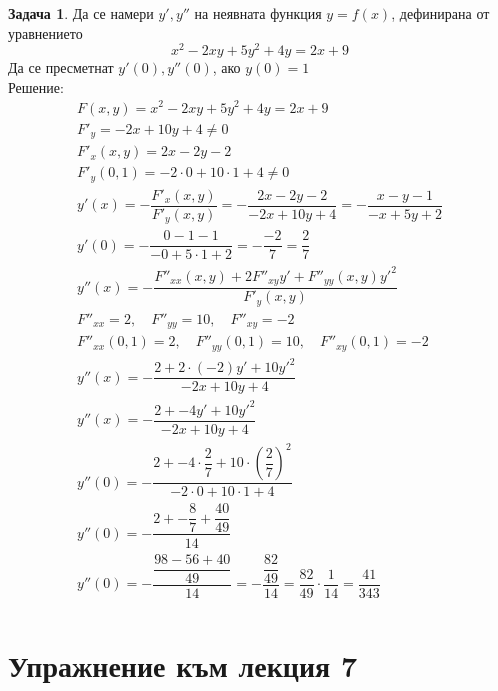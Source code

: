 \documentclass[a4paper,fleqn,12pt]{article}
\theoremstyle{definition}
\newtheorem{task}{Задача}[subsection]
\begin{document}
\begin{task}
Да се намери $y', y''$ на неявната функция $y = f(x)$, дефинирана от уравнението 
$$x^2 - 2xy + 5y^2 + 4y = 2x + 9$$
Да се пресметнат $y'(0), y''(0)$, ако $y(0) = 1$ \\
Решение: 
\begin{gather*}
F(x,y) = x^2 - 2xy + 5y^2 + 4y = 2x + 9\\
F'_y = -2x + 10y + 4 \neq 0\\
F'_x(x,y) = 2x - 2y - 2\\
F'_y(0,1) = -2 \cdot 0 + 10 \cdot 1 + 4 \neq 0\\
y'(x) = - \dfrac{F'_x(x,y)}{F'_y(x,y)} = - \dfrac{2x - 2y - 2}{-2x + 10y + 4} = - \dfrac{x - y - 1}{- x + 5y + 2}\\
y'(0) = - \dfrac{0 - 1 - 1}{- 0 + 5 \cdot 1 + 2} = - \dfrac{-2}{7} = \dfrac{2}{7}\\
y''(x) = - \dfrac{F''_{xx}(x,y) + 2F''_{xy}y' + F''_{yy}(x,y)y'^2}{F'_y(x,y)}\\
F''_{xx} = 2, \quad F''_{yy} = 10, \quad F''_{xy} = -2\\
F''_{xx}(0,1) = 2, \quad F''_{yy}(0,1) = 10, \quad F''_{xy}(0,1) = -2\\
y''(x) = - \dfrac{2 + 2 \cdot (-2)y' + 10y'^2}{-2x + 10y + 4}\\
y''(x) = - \dfrac{2 + - 4y' + 10y'^2}{-2x + 10y + 4}\\
y''(0) = - \dfrac{2 + - 4 \cdot \dfrac{2}{7} + 10 \cdot \left( \dfrac{2}{7} \right) ^2}{-2 \cdot 0 + 10 \cdot 1 + 4}\\
y''(0) = - \dfrac{2 + - \dfrac{8}{7} + \dfrac{40}{49}}{14}\\
y''(0) = - \dfrac{\dfrac{98 - 56 + 40}{49}}{14} = - \dfrac{\dfrac{82}{49}}{14} = \dfrac{82}{49} \cdot \dfrac{1}{14} = \dfrac{41}{343}\\
\end{gather*}
\end{task}
\newpage
\section{Упражнение към лекция 7}
\end{document}
